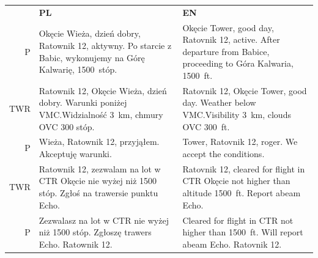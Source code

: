 \begin{tabular}{r m{8.5cm} m{8.5cm}}
	\rowcolor{vred} & \color{white}\textbf{PL}                                                                                        & \color{white}\textbf{EN} \\%
	P               & Okęcie Wieża, dzień dobry, Ratownik 12, aktywny. Po starcie z Babic, wykonujemy na Górę Kalwarię, 1500~stóp.
	                & Okęcie Tower, good day, Ratovnik 12, active. After departure from Babice, proceeding to Góra Kalwaria, 1500~ft.                            \\\midrule
	TWR             & Ratownik 12, Okęcie Wieża, dzień dobry. Warunki poniżej VMC.\@ Widzialność 3~km, chmury OVC 300 stóp.
	                & Ratovnik 12, Okęcie Tower, good day. Weather below VMC.\@ Visibility 3~km, clouds OVC 300~ft.                                              \\\midrule
	P               & Wieża, Ratownik 12, przyjąłem. Akceptuję warunki.                                                               &
	Tower, Ratovnik 12, roger. We accept the conditions.                                                                                                         \\\midrule
	TWR             & Ratownik 12, zezwalam na lot w CTR Okęcie nie wyżej niż 1500 stóp. Zgłoś na trawersie punktu Echo.
	                & Ratovnik 12, cleared for flight in CTR Okęcie not higher than altitude 1500~ft. Report abeam Echo.                                         \\\midrule
	P               & Zezwalasz na lot w CTR nie wyżej niż 1500 stóp. Zgłoszę trawers Echo. Ratownik 12.
	                & Cleared for flight in CTR not higher than 1500~ft. Will report abeam Echo. Ratovnik 12.                                                    \\\bottomrule
\end{tabular}

